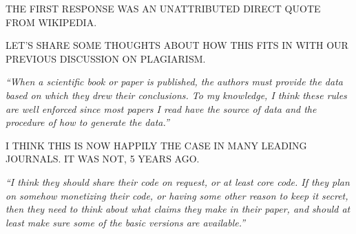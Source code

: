 \documentclass[portrait,11pt]{seminar}
\begin{document}
\es

\bs

THE FIRST RESPONSE WAS AN UNATTRIBUTED DIRECT QUOTE FROM WIKIPEDIA.

\medskip

LET'S SHARE SOME THOUGHTS ABOUT HOW THIS FITS IN WITH OUR PREVIOUS DISCUSSION ON PLAGIARISM.




\es
\bs

{\it ``When a scientific book or paper is published, the authors must provide the data based on which they drew their conclusions. To my knowledge, I think these rules are well enforced since most papers I read have the source of data and the procedure of how to generate the data.''}

\medskip

I THINK THIS IS NOW HAPPILY THE CASE IN MANY LEADING JOURNALS. IT WAS NOT, 5 YEARS AGO. 

\es  {}

{\it ``I think they should share their code on request, or at least core code. If they plan on somehow monetizing their code, or having some other reason to keep it secret, then they need to think about what claims they make in their paper, and should at least make sure some of the basic versions are available.''}


\end{document}
